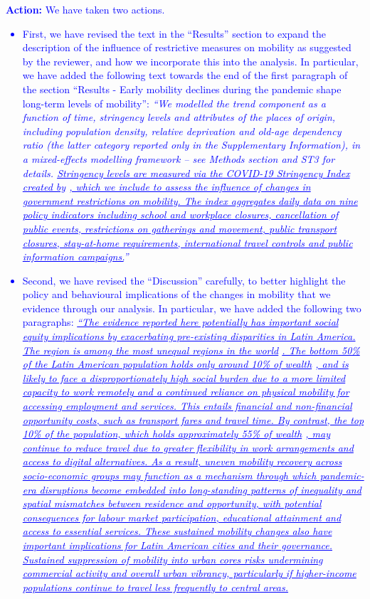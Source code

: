 \documentclass[12pt,a4paper,oneside, reqno]{amsart}
\begin{document}
\textcolor{blue}{
\textbf{Action:} We have taken two actions. 
\begin{itemize}[noitemsep, topsep=0pt]
    \item First, we have revised the text in the ``Results'' section to expand the description of the influence of restrictive measures on mobility as suggested by the reviewer, and how we incorporate this into the analysis. In particular, we have added the following text towards the end of the first paragraph of the section ``Results - Early mobility declines during the pandemic shape long-term levels of mobility'': \textit{``We modelled the trend component as a function of time, stringency levels and attributes of the places of origin, including population density, relative deprivation and old-age dependency ratio (the latter category reported only in the Supplementary Information), in a mixed-effects modelling framework – see Methods section and ST3 for details. \ul{Stringency levels are measured via the COVID-19 Stringency Index created by} \parencite{hale2021global}\ul{, which we include to assess the influence of changes in government restrictions on mobility. The index aggregates daily data on nine policy indicators including school and workplace closures, cancellation of public events, restrictions on gatherings and movement, public transport closures, stay-at-home requirements, international travel controls and public information campaigns.}''}
    \item Second, we have revised the ``Discussion'' carefully, to better highlight the policy and behavioural implications of the changes in mobility that we evidence through our analysis. In particular, we have added the following two paragraphs: \textit{\ul{``The evidence reported here potentially has important social equity implications by exacerbating pre-existing disparities in Latin America. The region is among the most unequal regions in the world} \parencite{WIReport22}\ul{. The bottom 50\% of the Latin American population holds only around 10\% of wealth} \parencite{WIReport22}\ul{, and is likely to face a disproportionately high social burden due to a more limited capacity to work remotely and a continued reliance on physical mobility for accessing employment and services. This entails financial and non-financial opportunity costs, such as transport fares and travel time. By contrast, the top 10\% of the population, which holds approximately 55\% of wealth} \parencite{WIReport22}\ul{, may continue to reduce travel due to greater flexibility in work arrangements and access to digital alternatives. As a result, uneven mobility recovery across socio-economic groups may function as a mechanism through which pandemic-era disruptions become embedded into long-standing patterns of inequality and spatial mismatches between residence and opportunity, with potential consequences for labour market participation, educational attainment and access to essential services. These sustained mobility changes also have important implications for Latin American cities and their governance. Sustained suppression of mobility into urban cores risks undermining commercial activity and overall urban vibrancy, particularly if higher-income populations continue to travel less frequently to central areas. }}

\end{itemize}}
\end{document}

